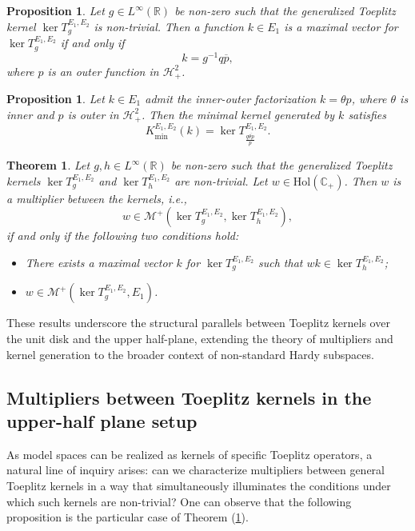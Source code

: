 \documentclass[12pt,a4paper]{amsart}
\newtheorem{theorem}{Theorem}[section]
\newtheorem{Proposition}[Definition]{Proposition}
\begin{document}
\begin{Proposition} \label{thm4}
Let \( g \in L^\infty(\mathbb{R}) \) be non-zero such that the generalized Toeplitz kernel \( \ker T_g^{E_1, E_2} \) is non-trivial. Then a function \( k \in E_1 \) is a maximal vector for \( \ker T_g^{E_1, E_2} \) if and only if
\[
k = g^{-1} q \overline{p},
\]
where \( p \) is an outer function in \( \mathcal{H}_+^2 \).
\end{Proposition}

\begin{Proposition}
Let \( k \in E_1 \) admit the inner-outer factorization \( k = \theta p \), where \( \theta \) is inner and \( p \) is outer in \( \mathcal{H}_+^2 \). Then the minimal kernel generated by \( k \) satisfies
\[
K_{\text{min}}^{E_1, E_2}(k) = \ker T_{\frac{q \overline{\theta p}}{p}}^{E_1, E_2}.
\]
\end{Proposition}

\begin{theorem}\label{th8}
Let \( g, h \in L^\infty(\mathbb{R}) \) be non-zero such that the generalized Toeplitz kernels \( \ker T_g^{E_1, E_2} \) and \( \ker T_h^{E_1, E_2} \) are non-trivial. Let \( w \in \mathrm{Hol}(\mathbb{C}_+) \). Then \( w \) is a multiplier between the kernels, i.e.,
\[
w \in \mathcal{M}^+(\ker T_g^{E_1, E_2}, \ker T_h^{E_1, E_2}),
\]
if and only if the following two conditions hold:
\begin{itemize}
    \item[(1)] There exists a maximal vector \( k \) for \( \ker T_g^{E_1, E_2} \) such that \( wk \in \ker T_h^{E_1, E_2} \);
    \item[(2)] \( w \in \mathcal{M}^+(\ker T_g^{E_1, E_2}, E_1) \).
\end{itemize}
\end{theorem}

These results underscore the structural parallels between Toeplitz kernels over the unit disk and the upper half-plane, extending the theory of multipliers and kernel generation to the broader context of non-standard Hardy subspaces.

\subsection{Multipliers between Toeplitz kernels in the upper-half plane setup}\label{sec4}
As model spaces can be realized as kernels of specific Toeplitz operators, a natural line of inquiry arises: can we characterize multipliers between general Toeplitz kernels in a way that simultaneously illuminates the conditions under which such kernels are non-trivial? One can observe that the following proposition is the particular case of Theorem (\ref{th8}).
\end{document}
